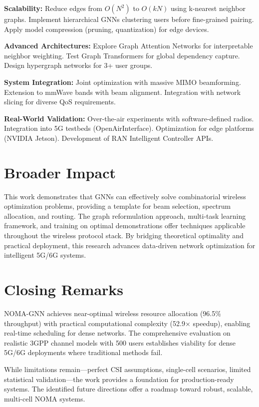 \textbf{Scalability:} Reduce edges from $O(N^2)$ to $O(kN)$ using k-nearest neighbor graphs. Implement hierarchical GNNs clustering users before fine-grained pairing. Apply model compression (pruning, quantization) for edge devices.

\textbf{Advanced Architectures:} Explore Graph Attention Networks for interpretable neighbor weighting. Test Graph Transformers for global dependency capture. Design hypergraph networks for 3+ user groups.

\textbf{System Integration:} Joint optimization with massive MIMO beamforming. Extension to mmWave bands with beam alignment. Integration with network slicing for diverse QoS requirements.

\textbf{Real-World Validation:} Over-the-air experiments with software-defined radios. Integration into 5G testbeds (OpenAirInterface). Optimization for edge platforms (NVIDIA Jetson). Development of RAN Intelligent Controller APIs.

\section{Broader Impact}

This work demonstrates that GNNs can effectively solve combinatorial wireless optimization problems, providing a template for beam selection, spectrum allocation, and routing. The graph reformulation approach, multi-task learning framework, and training on optimal demonstrations offer techniques applicable throughout the wireless protocol stack. By bridging theoretical optimality and practical deployment, this research advances data-driven network optimization for intelligent 5G/6G systems.

\section{Closing Remarks}

NOMA-GNN achieves near-optimal wireless resource allocation (96.5\% throughput) with practical computational complexity (52.9× speedup), enabling real-time scheduling for dense networks. The comprehensive evaluation on realistic 3GPP channel models with 500 users establishes viability for dense 5G/6G deployments where traditional methods fail.

While limitations remain—perfect CSI assumptions, single-cell scenarios, limited statistical validation—the work provides a foundation for production-ready systems. The identified future directions offer a roadmap toward robust, scalable, multi-cell NOMA systems.


